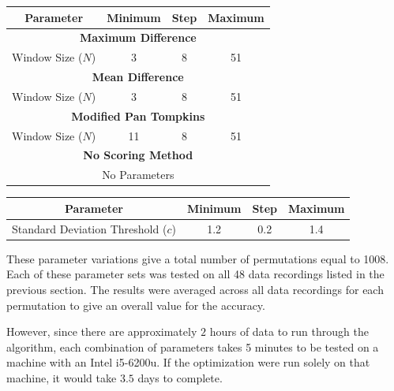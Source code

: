         \begin{center}
            \label{tbl_scoring}
            \begin{tabular}{|c|c|c|c|}
                \hline
                Parameter & Minimum & Step & Maximum \\
                \hline
                \multicolumn{4}{|c|}{\textbf{Maximum Difference}} \\
                \hline
                Window Size ($N$) & 3 & 8 & 51 \\
                \hline
                \multicolumn{4}{|c|}{\textbf{Mean Difference}} \\
                \hline
                Window Size ($N$) & 3 & 8 & 51 \\
                \hline
                \multicolumn{4}{|c|}{\textbf{Modified Pan Tompkins}} \\
                \hline
                Window Size ($N$) & 11 & 8 & 51 \\
                \hline
                \multicolumn{4}{|c|}{\textbf{No Scoring Method}} \\
                \hline
                \multicolumn{4}{|c|}{No Parameters} \\
                \hline
            \end{tabular}
        \end{center}
        \begin{center}
            \label{tbl_detection}
            \begin{tabular}{|c|c|c|c|}
                \hline
                Parameter & Minimum & Step & Maximum \\
                \hline
                Standard Deviation Threshold ($c$) & 1.2 & 0.2 & 1.4 \\
                \hline
            \end{tabular}
        \end{center}

        These parameter variations give a total number of permutations equal to 1008. Each of these parameter sets was tested on all 48 data recordings listed in the previous section. The results were averaged across all data recordings for each permutation to give an overall value for the accuracy.

        However, since there are approximately $2$ hours of data to run through the algorithm, each combination of parameters takes 5 minutes to be tested on a machine with an Intel i5-6200u. If the optimization were run solely on that machine, it would take $3.5$ days to complete.

